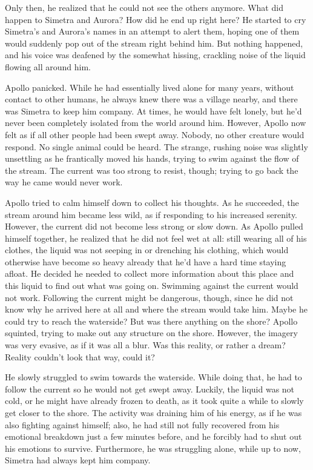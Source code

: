 Only then, he realized that he could not see the others anymore. What did happen to Simetra and Aurora? How did he end up right here? He started to cry Simetra's and Aurora's names in an attempt to alert them, hoping one of them would suddenly pop out of the stream right behind him. But nothing happened, and his voice was deafened by the somewhat hissing, crackling noise of the liquid flowing all around him. 

Apollo panicked. While he had essentially lived alone for many years, without contact to other humans, he always knew there was a village nearby, and there was Simetra to keep him company. At times, he would have felt lonely, but he'd never been completely isolated from the world around him. However, Apollo now felt as if all other people had been swept away. Nobody, no other creature would respond. No single animal could be heard. The strange, rushing noise was slightly unsettling as he frantically moved his hands, trying to swim against the flow of the stream. The current was too strong to resist, though; trying to go back the way he came would never work.

Apollo tried to calm himself down to collect his thoughts. As he succeeded, the stream around him became less wild, as if responding to his increased serenity. However, the current did not become less strong or slow down. As Apollo pulled himself together, he realized that he did not feel wet at all: still wearing all of his clothes, the liquid was not seeping in or drenching his clothing, which would otherwise have become so heavy already that he'd have a hard time staying afloat. He decided he needed to collect more information about this place and this liquid to find out what was going on. Swimming against the current would not work. Following the current might be dangerous, though, since he did not know why he arrived here at all and where the stream would take him. Maybe he could try to reach the waterside? But was there anything on the shore? Apollo squinted, trying to make out any structure on the shore. However, the imagery was very evasive, as if it was all a blur. Was this reality, or rather a dream? Reality couldn't look that way, could it? 

He slowly struggled to swim towards the waterside. While doing that, he had to follow the current so he would not get swept away. Luckily, the liquid was not cold, or he might have already frozen to death, as it took quite a while to slowly get closer to the shore. The activity was draining him of his energy, as if he was also fighting against himself; also, he had still not fully recovered from his emotional breakdown just a few minutes before, and he forcibly had to shut out his emotions to survive. Furthermore, he was struggling alone, while up to now, Simetra had always kept him company.

